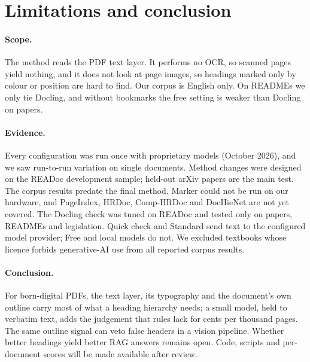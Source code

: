 \documentclass[10pt,twocolumn,letterpaper]{article}
\begin{document}
\section{Limitations and conclusion}
\label{sec:limits}

\paragraph{Scope.} The method reads the PDF text layer. It performs no OCR, so scanned pages yield
nothing, and it does not look at page images, so headings marked only by colour or position are hard
to find. Our corpus is English only. On READMEs we only tie Docling, and without bookmarks the free
setting is weaker than Docling on papers.

\paragraph{Evidence.} Every configuration was run once with proprietary models (October 2026), and we
saw run-to-run variation on single documents. Method changes were designed on the READoc development
sample; held-out arXiv papers are the main test. The corpus results predate the final method. Marker
could not be run on our hardware, and PageIndex, HRDoc, Comp-HRDoc and DocHieNet are not yet covered.
The Docling check was tuned on READoc and tested only on papers, READMEs and legislation. Quick check
and Standard send text to the configured model provider; Free and local models do not. We excluded
textbooks whose licence forbids generative-AI use from all reported corpus results.

\paragraph{Conclusion.} For born-digital PDFs, the text layer, its typography and the document's own
outline carry most of what a heading hierarchy needs; a small model, held to verbatim text, adds the
judgement that rules lack for cents per thousand pages. The same outline signal can veto false headers
in a vision pipeline. Whether better headings yield better RAG answers remains open. Code, scripts
and per-document scores will be made available after review.

{
    \small
    
    
}
\end{document}
